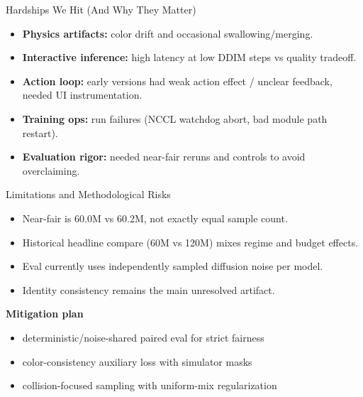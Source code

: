 \documentclass[aspectratio=169,11pt]{beamer}
\begin{document}
\begin{frame}{Hardships We Hit (And Why They Matter)}
\begin{itemize}
  \item \textbf{Physics artifacts:} color drift and occasional swallowing/merging.
  \item \textbf{Interactive inference:} high latency at low DDIM steps vs quality tradeoff.
  \item \textbf{Action loop:} early versions had weak action effect / unclear feedback, needed UI instrumentation.
  \item \textbf{Training ops:} run failures (NCCL watchdog abort, bad module path restart).
  \item \textbf{Evaluation rigor:} needed near-fair reruns and controls to avoid overclaiming.
\end{itemize}
\end{frame}

\begin{frame}{Limitations and Methodological Risks}
\begin{itemize}
  \item Near-fair is 60.0M vs 60.2M, not exactly equal sample count.
  \item Historical headline compare (60M vs 120M) mixes regime and budget effects.
  \item Eval currently uses independently sampled diffusion noise per model.
  \item Identity consistency remains the main unresolved artifact.
\end{itemize}
\vspace{0.4em}
\textbf{Mitigation plan}
\begin{itemize}
  \item deterministic/noise-shared paired eval for strict fairness
  \item color-consistency auxiliary loss with simulator masks
  \item collision-focused sampling with uniform-mix regularization
\end{itemize}
\end{frame}
\end{document}
